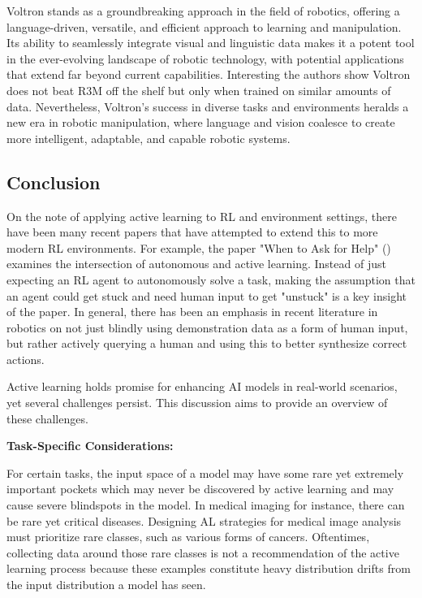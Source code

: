 \documentclass[
  letterpaper,
  numbers=noenddot,
  DIV=11]{scrreprt}
\theoremstyle{plain}
\theoremstyle{definition}
\theoremstyle{plain}
\theoremstyle{remark}
\begin{document}
Voltron stands as a groundbreaking approach in the field of robotics,
offering a language-driven, versatile, and efficient approach to
learning and manipulation. Its ability to seamlessly integrate visual
and linguistic data makes it a potent tool in the ever-evolving
landscape of robotic technology, with potential applications that extend
far beyond current capabilities. Interesting the authors show Voltron
does not beat R3M off the shelf but only when trained on similar amounts
of data. Nevertheless, Voltron's success in diverse tasks and
environments heralds a new era in robotic manipulation, where language
and vision coalesce to create more intelligent, adaptable, and capable
robotic systems.

\subsection{Conclusion}\label{conclusion}

On the note of applying active learning to RL and environment settings,
there have been many recent papers that have attempted to extend this to
more modern RL environments. For example, the paper "When to Ask for
Help" () examines the
intersection of autonomous and active learning. Instead of just
expecting an RL agent to autonomously solve a task, making the
assumption that an agent could get stuck and need human input to get
"unstuck" is a key insight of the paper. In general, there has been an
emphasis in recent literature in robotics on not just blindly using
demonstration data as a form of human input, but rather actively
querying a human and using this to better synthesize correct actions.

Active learning holds promise for enhancing AI models in real-world
scenarios, yet several challenges persist. This discussion aims to
provide an overview of these challenges.

\textbf{Task-Specific Considerations:}

For certain tasks, the input space of a model may have some rare yet
extremely important pockets which may never be discovered by active
learning and may cause severe blindspots in the model. In medical
imaging for instance, there can be rare yet critical diseases. Designing
AL strategies for medical image analysis must prioritize rare classes,
such as various forms of cancers. Oftentimes, collecting data around
those rare classes is not a recommendation of the active learning
process because these examples constitute heavy distribution drifts from
the input distribution a model has seen.
\end{document}
